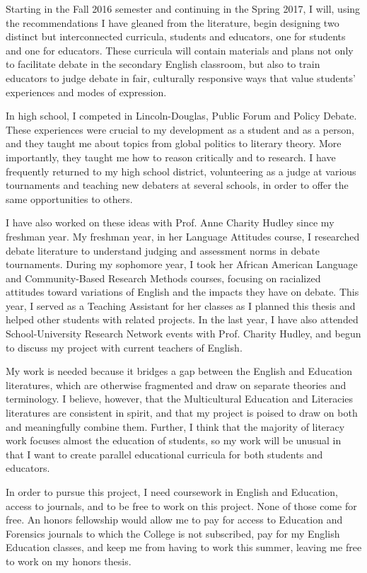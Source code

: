 \documentclass[man,12pt,natbib]{apa6}
\begin{document}
Starting in the Fall 2016 semester and continuing in the Spring 2017, I will,
using the recommendations I have gleaned from the literature, begin designing
two distinct but interconnected curricula, students and educators, one for
students and one for educators. These curricula will contain materials and
plans not only to facilitate debate in the secondary English classroom, but
also to train educators to judge debate in fair, culturally responsive ways
that value students’ experiences and modes of expression.

In high school, I competed in Lincoln-Douglas, Public Forum and Policy Debate.
These experiences were crucial to my development as a student and as a person,
and they taught me about topics from global politics to literary theory. More
importantly, they taught me how to reason critically and to research. I have
frequently returned to my high school district, volunteering as a judge at
various tournaments and teaching new debaters at several schools, in order to
offer the same opportunities to others.

I have also worked on these ideas with Prof. Anne Charity Hudley since my
freshman year. My freshman year, in her Language Attitudes course, I researched
debate literature to understand judging and assessment norms in debate
tournaments. During my sophomore year, I took her African American Language and
Community-Based Research Methods courses, focusing on racialized attitudes
toward variations of English and the impacts they have on debate. This year, I
served as a Teaching Assistant for her classes as I planned this thesis and
helped other students with related projects. In the last year, I have also
attended School-University Research Network events with Prof. Charity Hudley,
and begun to discuss my project with current teachers of English.

My work is needed because it bridges a gap between the English and Education
literatures, which are otherwise fragmented and draw on separate theories and
terminology.  I believe, however, that the Multicultural Education and
Literacies literatures are consistent in spirit, and that my project is poised
to draw on both and meaningfully combine them. Further, I think that the
majority of literacy work focuses almost the education of students, so my work
will be unusual in that I want to create parallel educational curricula for
both students and educators.

In order to pursue this project, I need coursework in English and Education,
access to journals, and to be free to work on this project. None of those come
for free. An honors fellowship would allow me to pay for access to Education
and Forensics journals to which the College is not subscribed, pay for my
English Education classes, and keep me from having to work this summer, leaving
me free to work on my honors thesis.

\clearpage

\end{document}
